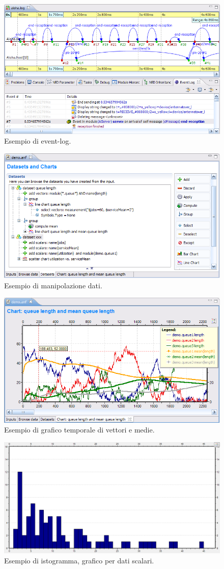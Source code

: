 \begin{figure}[t]
	\centering
	\includegraphics[width=0.7\linewidth]{Images/omnet/elog_02}
	\caption[anf file]{Esempio di event-log.}
	\label{fig:elog_02}
\end{figure}
\bigskip
\begin{figure}[tbh]
	\centering
	\includegraphics[width=0.7\linewidth]{Images/omnet/esempio_anf_01}
	\caption[anf file]{Esempio di manipolazione dati.}
	\label{fig:esempio_anf_01}
\end{figure}
\bigskip
\begin{figure}[tbh]
	\centering
	\includegraphics[width=0.7\linewidth]{Images/omnet/esempio_anf_grafico_01}
	\caption[anf file]{Esempio di grafico temporale di vettori e medie.}
	\label{fig:esempio_anf_grafico_01}
\end{figure}
\bigskip
\begin{figure}[tbh]
	\centering
	\includegraphics[width=0.7\linewidth]{Images/omnet/tictoc_scalar_01}
	\caption[anf file]{Esempio di istogramma, grafico per dati scalari.}
	\label{fig:tictoc_scalar_01}
\end{figure}
